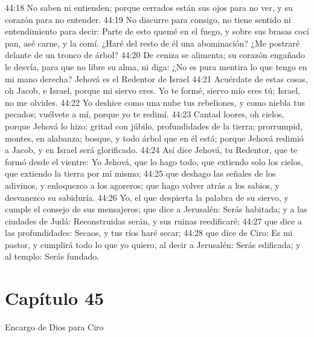 44:18 No saben ni entienden; porque cerrados están sus ojos para no ver, y su corazón para no entender. 
44:19 No discurre para consigo, no tiene sentido ni entendimiento para decir: Parte de esto quemé en el fuego, y sobre sus brasas cocí pan, asé carne, y la comí. ¿Haré del resto de él una abominación? ¿Me postraré delante de un tronco de árbol? 
44:20 De ceniza se alimenta; su corazón engañado le desvía, para que no libre su alma, ni diga: ¿No es pura mentira lo que tengo en mi mano derecha? 
Jehová es el Redentor de Israel 
44:21 Acuérdate de estas cosas, oh Jacob, e Israel, porque mi siervo eres. Yo te formé, siervo mío eres tú; Israel, no me olvides. 
44:22 Yo deshice como una nube tus rebeliones, y como niebla tus pecados; vuélvete a mí, porque yo te redimí. 
44:23 Cantad loores, oh cielos, porque Jehová lo hizo; gritad con júbilo, profundidades de la tierra; prorrumpid, montes, en alabanza; bosque, y todo árbol que en él está; porque Jehová redimió a Jacob, y en Israel será glorificado. 
44:24 Así dice Jehová, tu Redentor, que te formó desde el vientre: Yo Jehová, que lo hago todo, que extiendo solo los cielos, que extiendo la tierra por mí mismo; 
44:25 que deshago las señales de los adivinos, y enloquezco a los agoreros; que hago volver atrás a los sabios, y desvanezco su sabiduría. 
44:26 Yo, el que despierta la palabra de su siervo, y cumple el consejo de sus mensajeros; que dice a Jerusalén: Serás habitada; y a las ciudades de Judá: Reconstruidas serán, y sus ruinas reedificaré; 
44:27 que dice a las profundidades: Secaos, y tus ríos haré secar; 
44:28 que dice de Ciro: Es mi pastor, y cumplirá todo lo que yo quiero, al decir a Jerusalén: Serás edificada; y al templo: Serás fundado. 
\section*{Capítulo 45 }
Encargo de Dios para Ciro 

